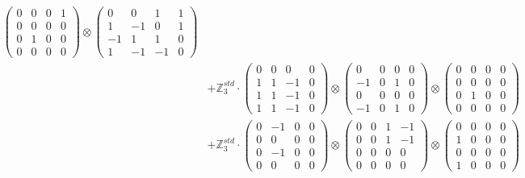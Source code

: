 \documentclass{article}
\begin{document}
{\begin{align}
            \begin{pmatrix} 0 & 0 & 0 & 1 \\ 0 & 0 & 0 & 0 \\ 0 & 1 & 0 & 0 \\ 0 & 0 & 0 & 0 \end{pmatrix} \otimes 
            \begin{pmatrix} 0 & 0 & 1 & 1 \\ 1 & -1 & 0 & 1 \\ -1 & 1 & 1 & 0 \\ 1 & -1 & -1 & 0 \end{pmatrix} \\ 
        &+ \label{Rs16-Rc11-Solution-30-c20} \mathbb{Z}_3^{std} \cdot 
            \begin{pmatrix} 0 & 0 & 0 & 0 \\ 1 & 1 & -1 & 0 \\ 1 & 1 & -1 & 0 \\ 1 & 1 & -1 & 0 \end{pmatrix} \otimes 
            \begin{pmatrix} 0 & 0 & 0 & 0 \\ -1 & 0 & 1 & 0 \\ 0 & 0 & 0 & 0 \\ -1 & 0 & 1 & 0 \end{pmatrix} \otimes 
            \begin{pmatrix} 0 & 0 & 0 & 0 \\ 0 & 0 & 0 & 0 \\ 0 & 1 & 0 & 0 \\ 0 & 0 & 0 & 0 \end{pmatrix} \\ 
        &+ \label{Rs16-Rc11-Solution-30-c21} \mathbb{Z}_3^{std} \cdot 
            \begin{pmatrix} 0 & -1 & 0 & 0 \\ 0 & 0 & 0 & 0 \\ 0 & -1 & 0 & 0 \\ 0 & 0 & 0 & 0 \end{pmatrix} \otimes 
            \begin{pmatrix} 0 & 0 & 1 & -1 \\ 0 & 0 & 1 & -1 \\ 0 & 0 & 0 & 0 \\ 0 & 0 & 0 & 0 \end{pmatrix} \otimes 
            \begin{pmatrix} 0 & 0 & 0 & 0 \\ 1 & 0 & 0 & 0 \\ 0 & 0 & 0 & 0 \\ 1 & 0 & 0 & 0 \end{pmatrix} \\ 

\end{align}}
\end{document}
